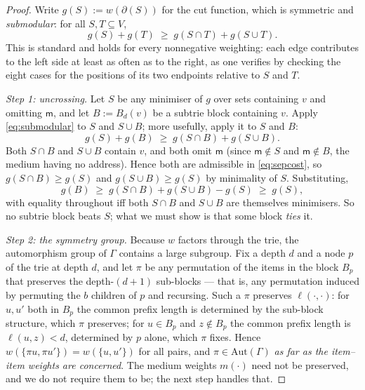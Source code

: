 \documentclass[11pt,twocolumn,a4paper]{article}
\theoremstyle{thmstyle}
\theoremstyle{definition}
\theoremstyle{remark}
\newcommand{\Gph}{\Gamma}
\newcommand{\V}{V}
\newcommand{\wt}{w}
\newcommand{\med}{\mathsf{m}}
\newcommand{\cut}{\partial}
\begin{document}
\begin{proof}
Write $g(S) := \wt(\cut(S))$ for the cut function, which is symmetric
and \emph{submodular}: for all $S,T \subseteq \V$,
\begin{equation}
  g(S) + g(T) \;\geq\; g(S \cap T) + g(S \cup T).
  \label{eq:submodular}
\end{equation}
This is standard and holds for every nonnegative weighting: each edge
contributes to the left side at least as often as to the right, as one
verifies by checking the eight cases for the positions of its two
endpoints relative to $S$ and $T$.

\emph{Step 1: uncrossing.} Let $S$ be any minimiser of $g$ over sets
containing $v$ and omitting $\med$, and let $B := B_d(v)$ be a subtrie
block containing $v$. Apply \eqref{eq:submodular} to $S$ and
$S \cup B$; more usefully, apply it to $S$ and $B$:
\[
  g(S) + g(B) \;\geq\; g(S \cap B) + g(S \cup B).
\]
Both $S \cap B$ and $S \cup B$ contain $v$, and both omit $\med$
(since $\med \notin S$ and $\med \notin B$, the medium having no
address). Hence both are admissible in \eqref{eq:sepcost}, so
$g(S \cap B) \geq g(S)$ and $g(S \cup B) \geq g(S)$ by minimality of
$S$. Substituting,
\begin{equation}
  g(B) \;\geq\; g(S \cap B) + g(S \cup B) - g(S) \;\geq\; g(S),
  \label{eq:uncross}
\end{equation}
with equality throughout iff both $S \cap B$ and $S \cup B$ are
themselves minimisers. So no subtrie block beats $S$; what we must show
is that some block \emph{ties} it.

\emph{Step 2: the symmetry group.} Because $\wt$ factors through the
trie, the automorphism group of $\Gph$ contains a large subgroup.
Fix a depth $d$ and a node $p$ of the trie at depth $d$, and let
$\pi$ be any permutation of the items in the block $B_p$ that
preserves the depth-$(d+1)$ sub-blocks --- that is, any permutation
induced by permuting the $b$ children of $p$ and recursing. Such a
$\pi$ preserves $\ell(\cdot,\cdot)$: for $u,u'$ both in $B_p$ the
common prefix length is determined by the sub-block structure, which
$\pi$ preserves; for $u \in B_p$ and $z \notin B_p$ the common prefix
length is $\ell(u,z) < d$, determined by $p$ alone, which $\pi$ fixes.
Hence $\wt(\{\pi u, \pi u'\}) = \wt(\{u,u'\})$ for all pairs, and
$\pi \in \mathrm{Aut}(\Gph)$ \emph{as far as the item--item weights are
concerned}. The medium weights $m(\cdot)$ need not be preserved, and we
do not require them to be; the next step handles that.


\end{proof}
\end{document}
